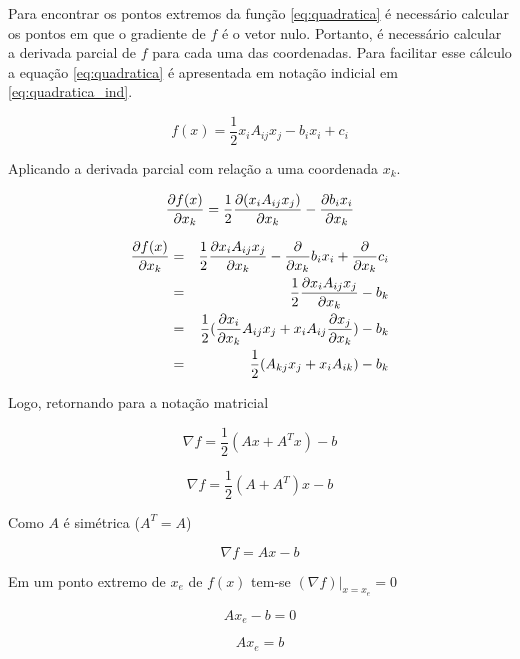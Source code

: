 Para encontrar os pontos extremos da função \ref{eq:quadratica} é necessário calcular os pontos em que o gradiente de $f$ é o vetor nulo. Portanto, é necessário calcular a derivada parcial de $f$ para cada uma das coordenadas. Para facilitar esse cálculo a equação \ref{eq:quadratica} é apresentada em notação indicial em \ref{eq:quadratica_ind}.


\begin{equation} \label{eq:quadratica_ind}
    f(x) = \frac{1}{2} x_i A_{ij} x_j - b_i x_i + c_i
\end{equation}


Aplicando a derivada parcial com relação a uma coordenada $x_k$.

\begin{equation}
    \dxk[f(x)] = \frac{1}{2}  \dxk[ (x_i A_{ij} x_j) ]- \dxk[b_i x_i]
\end{equation}

\begin{eqnarray}
     \dxk[f(x)] & = & \frac{1}{2} \dxk[ x_i A_{ij} x_j ]- \dxk{b_i x_i}+ \dxk{c_i} \\
                & = & \frac{1}{2} \dxk[ x_i A_{ij} x_j ]- b_k \\
                & = & \frac{1}{2} (\dxk[ x_i ]A_{ij} x_j  + x_i A_{ij} \dxk[x_j]) - b_k \\
                & = & \frac{1}{2}(A_{kj} x_j  + x_i A_{ik})  - b_k
\end{eqnarray}


Logo, retornando para a notação matricial


\begin{equation}
    \nabla f = \frac{1}{2} (Ax + A^T x) - b
\end{equation}


\begin{equation}
    \nabla f = \frac{1}{2} (A + A^T) x - b
\end{equation}

Como $A$ é simétrica ($A^T = A$)

\begin{equation} \label{eq:gradf}
    \nabla f = A x - b
\end{equation}

Em um ponto extremo de  $ x_e$ de $f(x)$ tem-se $(\nabla f)|_{x=x_e} = 0 $

\begin{equation}
    Ax_e - b = 0
\end{equation}

\begin{equation}
    Ax_e = b
\end{equation}

